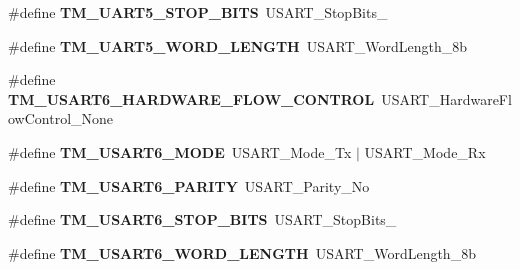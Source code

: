 \begin{DoxyCompactItemize}
\item 
\hypertarget{group___t_m___u_s_a_r_t___macros_gabda89721e486231e845d2063b6ea0882}{}\#define {\bfseries T\+M\+\_\+\+U\+A\+R\+T5\+\_\+\+S\+T\+O\+P\+\_\+\+B\+I\+T\+S}~U\+S\+A\+R\+T\+\_\+\+Stop\+Bits\+\_\label{group___t_m___u_s_a_r_t___macros_gabda89721e486231e845d2063b6ea0882}

\item 
\hypertarget{group___t_m___u_s_a_r_t___macros_gabda3e3a3c2c18fedd557f1c576678548}{}\#define {\bfseries T\+M\+\_\+\+U\+A\+R\+T5\+\_\+\+W\+O\+R\+D\+\_\+\+L\+E\+N\+G\+T\+H}~U\+S\+A\+R\+T\+\_\+\+Word\+Length\+\_\+8b\label{group___t_m___u_s_a_r_t___macros_gabda3e3a3c2c18fedd557f1c576678548}

\item 
\hypertarget{group___t_m___u_s_a_r_t___macros_gad47088c6f2f8a26f019eb8ba179ed845}{}\#define {\bfseries T\+M\+\_\+\+U\+S\+A\+R\+T6\+\_\+\+H\+A\+R\+D\+W\+A\+R\+E\+\_\+\+F\+L\+O\+W\+\_\+\+C\+O\+N\+T\+R\+O\+L}~U\+S\+A\+R\+T\+\_\+\+Hardware\+Flow\+Control\+\_\+\+None\label{group___t_m___u_s_a_r_t___macros_gad47088c6f2f8a26f019eb8ba179ed845}

\item 
\hypertarget{group___t_m___u_s_a_r_t___macros_ga867d0beae07b705e1868f52dbb40a738}{}\#define {\bfseries T\+M\+\_\+\+U\+S\+A\+R\+T6\+\_\+\+M\+O\+D\+E}~U\+S\+A\+R\+T\+\_\+\+Mode\+\_\+\+Tx $\vert$ U\+S\+A\+R\+T\+\_\+\+Mode\+\_\+\+Rx\label{group___t_m___u_s_a_r_t___macros_ga867d0beae07b705e1868f52dbb40a738}

\item 
\hypertarget{group___t_m___u_s_a_r_t___macros_ga773f7b1e8c0fb7974fc5ac570d1a7021}{}\#define {\bfseries T\+M\+\_\+\+U\+S\+A\+R\+T6\+\_\+\+P\+A\+R\+I\+T\+Y}~U\+S\+A\+R\+T\+\_\+\+Parity\+\_\+\+No\label{group___t_m___u_s_a_r_t___macros_ga773f7b1e8c0fb7974fc5ac570d1a7021}

\item 
\hypertarget{group___t_m___u_s_a_r_t___macros_ga19c655d963df372ed1bd87eadc7b94d7}{}\#define {\bfseries T\+M\+\_\+\+U\+S\+A\+R\+T6\+\_\+\+S\+T\+O\+P\+\_\+\+B\+I\+T\+S}~U\+S\+A\+R\+T\+\_\+\+Stop\+Bits\+\_\label{group___t_m___u_s_a_r_t___macros_ga19c655d963df372ed1bd87eadc7b94d7}

\item 
\hypertarget{group___t_m___u_s_a_r_t___macros_gaa2a2f929d7011024b463aa981a2a22a2}{}\#define {\bfseries T\+M\+\_\+\+U\+S\+A\+R\+T6\+\_\+\+W\+O\+R\+D\+\_\+\+L\+E\+N\+G\+T\+H}~U\+S\+A\+R\+T\+\_\+\+Word\+Length\+\_\+8b\label{group___t_m___u_s_a_r_t___macros_gaa2a2f929d7011024b463aa981a2a22a2}


\end{DoxyCompactItemize}
